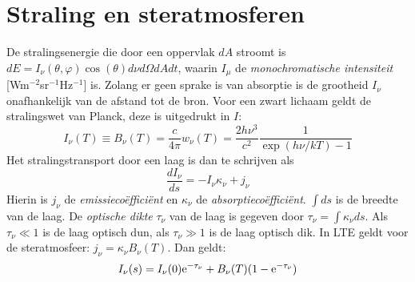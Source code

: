 \documentclass[twoside]{report}
\begin{document}
\section{Straling en steratmosferen}
De stralingsenergie die door een oppervlak $dA$ stroomt is
$dE=I_\nu(\theta,\varphi)\cos(\theta)d\nu d\Omega dAdt$, waarin $I_\mu$ de
{\it monochromatische intensiteit} [Wm$^{-2}$sr$^{-1}$Hz$^{-1}$] is.
Zolang er geen sprake is van absorptie is de grootheid $I_\nu$ onafhankelijk
van de afstand tot de bron. Voor een zwart lichaam geldt de stralingswet van
Planck, deze is uitgedrukt in $I$:
\[
I_\nu(T)\equiv B_\nu(T)=\frac{c}{4\pi}w_\nu(T)=\frac{2h\nu^3}{c^2}\frac{1}{\exp(h\nu/kT)-1}
\]
Het stralingstransport door een laag is dan te schrijven als
\[
\frac{dI_\nu}{ds}=-I_\nu\kappa_\nu+j_\nu
\]
Hierin is $j_\nu$ de {\it emissieco\"effici\"ent} en $\kappa_\nu$ de
{\it absorptieco\"effici\"ent}. $\int ds$ is de breedte van de laag. De
{\it optische dikte} $\tau_\nu$ van de laag is gegeven door
$\tau_\nu=\int\kappa_\nu ds$. Als $\tau_\nu\ll1$ is de laag optisch dun, als
$\tau_\nu\gg1$ is de laag optisch dik. In LTE geldt voor de steratmosfeer:
$j_\nu=\kappa_\nu B_\nu(T)$. Dan geldt:
\[
I_\nu(s)=I_\nu(0){\rm e}^{-\tau_\nu}+B_\nu(T)(1-{\rm e}^{-\tau_\nu})
\]
\end{document}
